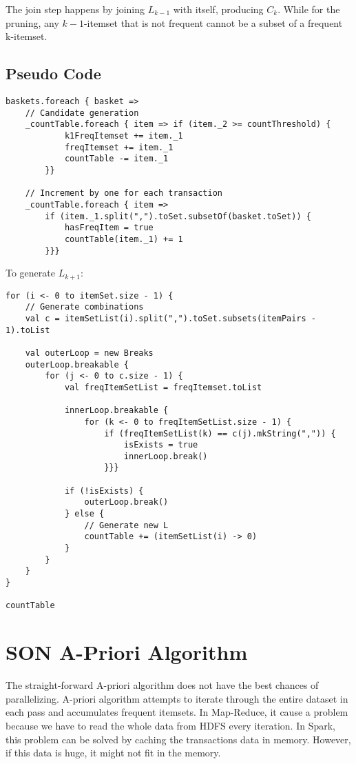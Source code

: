\documentclass[11pt]{article}
\begin{document}
The join step happens by joining $L_{k-1}$ with itself, producing $C_k$.
While for the pruning, any $k-1$-itemset that is not frequent cannot be a subset of a frequent k-itemset.


\subsection {Pseudo Code}
\begin{lstlisting}
baskets.foreach { basket =>
    // Candidate generation
    _countTable.foreach { item => if (item._2 >= countThreshold) {
            k1FreqItemset += item._1
            freqItemset += item._1
            countTable -= item._1
        }}

    // Increment by one for each transaction
    _countTable.foreach { item =>
        if (item._1.split(",").toSet.subsetOf(basket.toSet)) {
            hasFreqItem = true
            countTable(item._1) += 1
        }}}
\end{lstlisting}

To generate $L_{k+1}$: \\

\begin{lstlisting}
for (i <- 0 to itemSet.size - 1) {
    // Generate combinations
    val c = itemSetList(i).split(",").toSet.subsets(itemPairs - 1).toList

    val outerLoop = new Breaks
    outerLoop.breakable {
        for (j <- 0 to c.size - 1) {
            val freqItemSetList = freqItemset.toList

            innerLoop.breakable {
                for (k <- 0 to freqItemSetList.size - 1) {
                    if (freqItemSetList(k) == c(j).mkString(",")) {
                        isExists = true
                        innerLoop.break()
                    }}}

            if (!isExists) {
                outerLoop.break()
            } else {
                // Generate new L
                countTable += (itemSetList(i) -> 0)
            }
        }
    }
}

countTable
\end{lstlisting}

\section{SON A-Priori Algorithm}

The straight-forward A-priori algorithm does not have the best chances of parallelizing.
A-priori algorithm attempts to iterate through the entire dataset in each pass and accumulates frequent itemsets.
In Map-Reduce, it cause a problem because we have to read the whole data from HDFS every iteration.
In Spark, this problem can be solved by caching the transactions data in memory.
However, if this data is huge, it might not fit in the memory.
\end{document}
